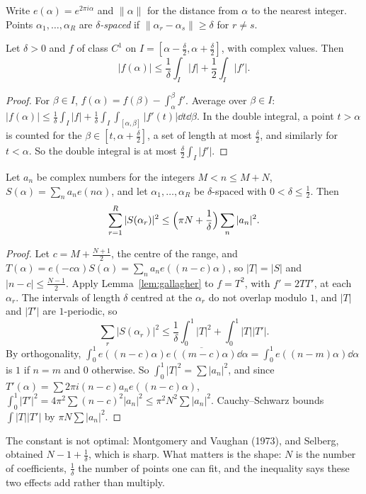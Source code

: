 Write $e(\alpha)=e^{2\pi i\alpha}$ and $\|\alpha\|$ for the distance from $\alpha$ to the nearest integer. Points $\alpha_1,\dots,\alpha_R$ are \emph{$\delta$-spaced} if $\|\alpha_r-\alpha_s\|\ge\delta$ for $r\ne s$.

\begin{lemma}[Gallagher]\label{lem:gallagher}
Let $\delta>0$ and $f$ of class $C^1$ on $I=[\alpha-\frac\delta2,\alpha+\frac\delta2]$, with complex values. Then
\[
|f(\alpha)|\le\frac1\delta\int_I|f|+\frac12\int_I|f'|.
\]
\end{lemma}
\begin{proof}
For $\beta\in I$, $f(\alpha)=f(\beta)-\int_\alpha^\beta f'$. Average over $\beta\in I$: $|f(\alpha)|\le\frac1\delta\int_I|f|+\frac1\delta\int_I\int_{[\alpha,\beta]}|f'(t)|\dd t\dd\beta$. In the double integral, a point $t>\alpha$ is counted for the $\beta\in[t,\alpha+\frac\delta2]$,
a set of length at most $\frac\delta2$, and similarly for $t<\alpha$. So the double integral is at most $\frac\delta2\int_I|f'|$.
\end{proof}

\begin{theorem}\label{thm:largesieve}
Let $a_n$ be complex numbers for the integers $M<n\le M+N$, $S(\alpha)=\sum_na_ne(n\alpha)$, and let $\alpha_1,\dots,\alpha_R$ be $\delta$-spaced with $0<\delta\le\frac12$. Then
\[
\sum_{r=1}^R|S(\alpha_r)|^2\le\Bigl(\pi N+\frac1\delta\Bigr)\sum_n|a_n|^2.
\]
\end{theorem}
\begin{proof}
Let $c=M+\frac{N+1}2$, the centre of the range, and $T(\alpha)=e(-c\alpha)S(\alpha)=\sum_na_ne((n-c)\alpha)$, so $|T|=|S|$ and $|n-c|\le\frac{N-1}2$. Apply Lemma~\ref{lem:gallagher} to $f=T^2$, with $f'=2TT'$, at each $\alpha_r$.
The intervals of length $\delta$ centred at the $\alpha_r$ do not overlap modulo $1$, and $|T|$ and $|T'|$ are $1$-periodic, so
\[
\sum_r|S(\alpha_r)|^2\le\frac1\delta\int_0^1|T|^2+\int_0^1|T||T'|.
\]
By orthogonality, $\int_0^1e((n-c)\alpha)\overline{e((m-c)\alpha)}\dd\alpha=\int_0^1e((n-m)\alpha)\dd\alpha$ is $1$ if $n=m$ and $0$ otherwise. So $\int_0^1|T|^2=\sum|a_n|^2$, and since $T'(\alpha)=\sum2\pi i(n-c)a_ne((n-c)\alpha)$,
$\int_0^1|T'|^2=4\pi^2\sum(n-c)^2|a_n|^2\le\pi^2N^2\sum|a_n|^2$. Cauchy--Schwarz bounds $\int|T||T'|$ by $\pi N\sum|a_n|^2$.
\end{proof}

The constant is not optimal: Montgomery and Vaughan (1973), and Selberg, obtained $N-1+\frac1\delta$, which is sharp. What matters is the shape: $N$ is the number of coefficients, $\frac1\delta$ the
number of points one can fit, and the inequality says these two effects add rather than multiply.

